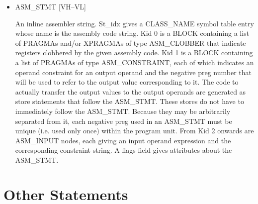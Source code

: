 \documentclass{article}
\begin{document}
\begin{itemize}
%
\item  ASM\_STMT \hfill [VH--VL]

An inline assembler string. St\_idx gives a CLASS\_NAME symbol
table entry whose name is the assembly code string. Kid 0 is a
%
BLOCK containing a list of
%
PRAGMAs and/or
%
XPRAGMAs of type
ASM\_CLOBBER that indicate registers clobbered by the given assembly
code. Kid 1 is a
%
BLOCK containing a list of
%
PRAGMAs of type
%
ASM\_CONSTRAINT, each of
which indicates an operand constraint for an output operand and
the negative preg number that will be used to refer to the output
value corresponding to it. The code to actually transfer the output
values to the output operands are generated as store statements
that follow the 
%
ASM\_STMT. These stores do not have to immediately
follow the 
%
ASM\_STMT. Because they may be arbitrarily separated from
it, each negative preg used in an
%
ASM\_STMT must be unique (i.e. used only once)
within the program unit. From Kid 2 onwards are 
%
ASM\_INPUT
nodes, each giving an input operand expression and the corresponding
constraint string. A flags field gives attributes about the ASM\_STMT.

\end{itemize}
\section{Other Statements}
\end{document}
